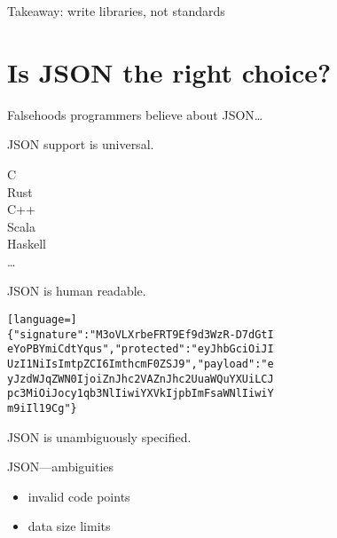 \documentclass[ignorenonframetext,aspectratio=43]{beamer}
\providecommand{\tightlist}{%
  \setlength{\itemsep}{0pt}\setlength{\parskip}{0pt}}
\begin{document}
\begin{frame}[plain]
\huge
Takeaway: write libraries, not standards
\end{frame}





\section{Is JSON the right choice?}

\begin{frame}[plain]
\huge
Falsehoods programmers believe about JSON\ldots
\end{frame}

\begin{frame}[plain]
\huge
JSON support is universal.
\end{frame}

\begin{frame}[plain]
\LARGE \centering
C \\
Rust \\
C++ \\
Scala \\
Haskell \\
\ldots
\end{frame}

\begin{frame}[plain]
\huge
JSON is human readable.
\end{frame}

\begin{frame}[fragile]
\begin{lstlisting}[language=]
{"signature":"M3oVLXrbeFRT9Ef9d3WzR-D7dGtI
eYoPBYmiCdtYqus","protected":"eyJhbGciOiJI
UzI1NiIsImtpZCI6ImthcmF0ZSJ9","payload":"e
yJzdWJqZWN0IjoiZnJhc2VAZnJhc2UuaWQuYXUiLCJ
pc3MiOiJocy1qb3NlIiwiYXVkIjpbImFsaWNlIiwiY
m9iIl19Cg"}
\end{lstlisting}
\end{frame}

\begin{frame}[plain]
\huge
JSON is unambiguously specified.
\end{frame}

\begin{frame}{JSON---ambiguities}
\begin{itemize}
\tightlist
\item invalid code points
\item data size limits
\end{itemize}
\end{frame}
\end{document}
